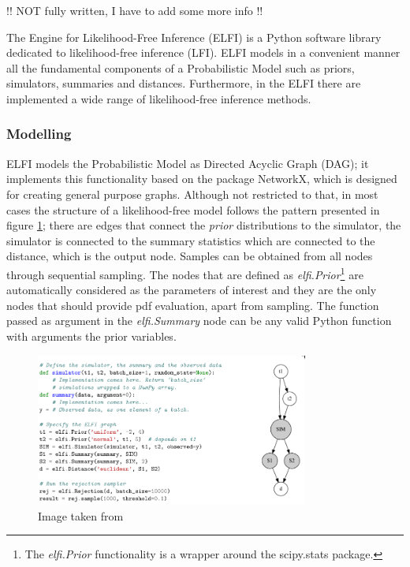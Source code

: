 !! NOT fully written, I have to add some more info !!

The Engine for Likelihood-Free Inference (ELFI) \cite{1708.00707} is a Python software library dedicated to likelihood-free inference (LFI). ELFI models in a convenient manner all the fundamental components of a Probabilistic Model such as priors, simulators, summaries and distances. Furthermore, in the ELFI there are implemented a wide range of likelihood-free inference methods.

\subsubsection{Modelling}
\label{sec:modelling}

ELFI models the Probabilistic Model as Directed Acyclic Graph (DAG);
it implements this functionality based on the package NetworkX, which
is designed for creating general purpose graphs. Although not
restricted to that, in most cases the structure of a likelihood-free
model follows the pattern presented in figure \ref{fig:elfi-model};
there are edges that connect the \textit{prior} distributions to the
simulator, the simulator is connected to the summary statistics which
are connected to the distance, which is the output node. Samples can
be obtained from all nodes through sequential sampling. The nodes that
are defined as \textit{elfi.Prior}\footnote{The \textit{elfi.Prior}
  functionality is a wrapper around the scipy.stats package.} are
automatically considered as the parameters of interest and they are
the only nodes that should provide pdf evaluation, apart from
sampling. The function passed as argument in the \textit{elfi.Summary}
node can be any valid Python function with arguments the prior
variables.

\begin{figure}[!ht]
    \begin{center}
      \includegraphics[width=0.8\textwidth]{./images/chapter2/elfi.png}
    \end{center}
    \caption{Image taken from \cite{1708.00707}}
    \label{fig:elfi-model}
\end{figure}


